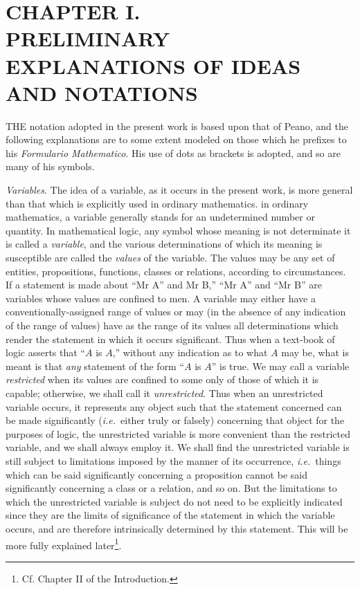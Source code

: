 \documentclass[letterpaper,12pt,openany,leqno]{book}
\newcommand{\pagefirst}[1]{\marginnote[\boxed{\text{#1}}]{\boxed{\text{#1}}}}
\begin{document}
\renewcommand{\thechapter}{\Roman{chapter}} %
\renewcommand{\thefootnote}{\fnsymbol{footnote}} %

\chapter*{\centering CHAPTER I. \\ PRELIMINARY EXPLANATIONS OF IDEAS AND NOTATIONS}   \pagefirst{4}

THE notation adopted in the present work is based upon that of Peano, and the following explanations are to some extent modeled on those which he prefixes to his \textit{Formulario Mathematico}. His use of dots as brackets is adopted, and so are many of his symbols. 

\textit{Variables}. The idea of a variable, as it occurs in the present work, is more general than that which is explicitly used in ordinary mathematics. in ordinary mathematics, a variable generally stands for an undetermined number or quantity. In mathematical logic, any symbol whose meaning is not determinate it is called a \textit{variable}, and the various determinations of which its meaning is susceptible are called the \textit{values} of the variable. The values may be any set of entities, propositions, functions, classes or relations, according to circumstances. If a statement is made about ``Mr A'' and Mr B,'' ``Mr A'' and ``Mr B'' are variables whose values are confined to men. A variable may either have a conventionally-assigned range of values or may (in the absence of any indication of the range of values) have as the range of its values all determinations which render the statement in which it occurs significant. Thus when a text-book of logic asserts that ``$A$ is $A$,'' without any indication as to what $A$ may be, what is meant is that \textit{any} statement of the form ``$A$ is $A$'' is true. We may call a variable \textit{restricted} when its values are confined to some only of those of which it is capable; otherwise, we shall call it \textit{unrestricted}. Thus when an unrestricted variable occurs, it represents any object such that the statement concerned can be made significantly (\textit{i.e.}\ either truly or falsely) concerning that object for the purposes of logic, the unrestricted variable is more convenient than the restricted variable, and we shall always employ it. We shall find the unrestricted variable is still subject to limitations imposed by the manner of its occurrence, \textit{i.e.}\ things which can be said significantly concerning a proposition cannot be said significantly concerning a class or a relation, and so on. But the limitations to which the unrestricted variable is subject do not need to be explicitly indicated since they are the limits of significance of the statement in which the variable occurs, and are therefore intrinsically determined by this statement. This will be more fully explained later\footnote{Cf. Chapter II of the Introduction.}.
\end{document}
